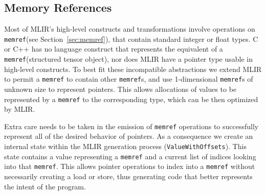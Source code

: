 \documentclass[sigplan]{acmart}
\newcommand{\icode}[1]{{\texttt {#1}}}
\newcommand{\memref}{\icode{memref}\xspace}
\begin{document}
\subsection{Memory References}
Most of MLIR's high-level constructs and transformations involve operations on \memref (see Section~\ref{sec:memref}), that contain standard integer or float types.
C or C++ has no language construct that represents the equivalent of a \memref (structured tensor object), nor does MLIR have a pointer type usable in high-level constructs. To best fit these incompatible abstractions we extend MLIR to permit a \memref to contain other {\memref}s, and use 1-dimensional {\memref}s of unknown size
to represent pointers. This allows allocations of values to be represented by a \memref to the corresponding type, which can be then optimized by MLIR.


Extra care needs to be taken in the emission of \memref operations to successfully represent all of the desired behavior of pointers. As a consequence we create an internal state within the MLIR generation process (\texttt{ValueWithOffsets}). This state contains a value representing a \memref and a current list of indices looking into that \memref. This allows pointer operations to index into a \memref without necessarily creating a load or store, thus generating code that better represents the intent of the program.

\end{document}
